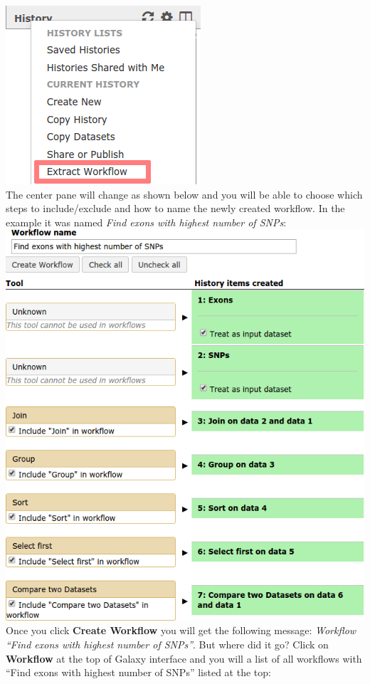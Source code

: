 \documentclass[11pt,a4paper]{article}
\begin{document}
\includegraphics[scale=0.65]{figures/101_24}\\
The center pane will change as shown below and you will be able to choose which steps to include/exclude and how to name the newly created workflow. In the example it was named \textit{Find exons with highest number of SNPs}:\\

\includegraphics[scale=0.55]{figures/101_25}\\
Once you click \textbf{Create Workflow} you will get the following message: \textit{Workflow ``Find exons with highest number of SNPs''}. But where did it go? Click on \textbf{Workflow} at the top of Galaxy interface and you will a list of all workflows with ``Find exons with highest number of SNPs'' listed at the top:\\
\end{document}
